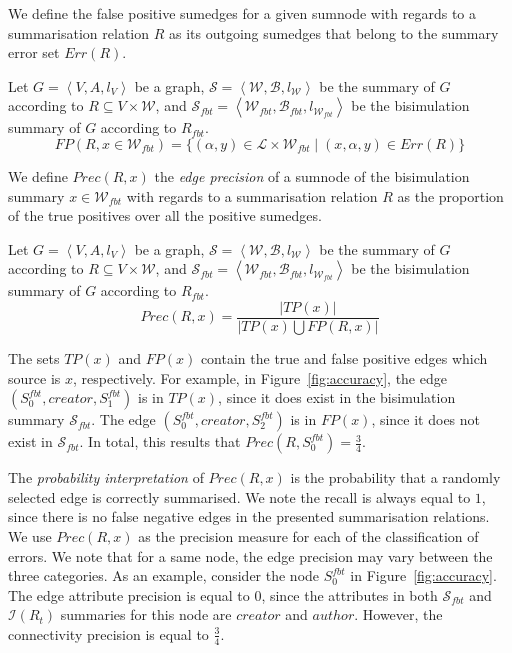 We define the false positive sumedges for a given sumnode with regards to a summarisation relation $R$ as its outgoing sumedges that belong to the summary error set $Err(R)$.

\begin{definition}
Let $G=\left\langle V, A, l_V \right\rangle$ be a graph, $\mathcal{S} = \left\langle \mathcal{W}, \mathcal{B}, l_{\mathcal{W}} \right\rangle$ be the summary of $G$ according to $R \subseteq V \times \mathcal{W}$, and $\mathcal{S}_{fbt} = \left\langle \mathcal{W}_{fbt}, \mathcal{B}_{fbt}, l_{\mathcal{W}_{fbt}} \right\rangle$ be the bisimulation summary of $G$ according to $R_{fbt}$.
$$
FP(R, x \in \mathcal{W}_{fbt}) = \{ (\alpha, y) \in \mathcal{L} \times \mathcal{W}_{fbt} \mid (x, \alpha, y) \in Err(R) \}
$$
\end{definition}

We define $Prec(R, x)$ the \emph{edge precision} of a sumnode of the bisimulation summary $x \in \mathcal{W}_{fbt}$ with regards to a summarisation relation $R$ as the proportion of the true positives over all the positive sumedges.

\begin{definition}
Let $G=\left\langle V, A, l_V \right\rangle$ be a graph, $\mathcal{S} = \left\langle \mathcal{W}, \mathcal{B}, l_{\mathcal{W}} \right\rangle$ be the summary of $G$ according to $R \subseteq V \times \mathcal{W}$, and $\mathcal{S}_{fbt} = \left\langle \mathcal{W}_{fbt}, \mathcal{B}_{fbt}, l_{\mathcal{W}_{fbt}} \right\rangle$ be the bisimulation summary of $G$ according to $R_{fbt}$.
$$
Prec(R, x) = \frac{\vert TP(x) \vert}{\vert TP(x) \bigcup FP(R, x) \vert}
$$
\end{definition}

The sets $TP(x)$ and $FP(x)$ contain the true and false positive edges which source is $x$, respectively. For example, in Figure~\ref{fig:accuracy}, the edge $(S^{fbt}_0, creator, S^{fbt}_1)$ is in $TP(x)$, since it does exist in the bisimulation summary $\mathcal{S}_{fbt}$. The edge $(S^{fbt}_0, creator, S^{fbt}_2)$ is in $FP(x)$, since it does not exist in $\mathcal{S}_{fbt}$. In total, this results that $Prec\left(R, S^{fbt}_0\right) = \frac{3}{4}$.

The \emph{probability interpretation} of $Prec(R, x)$ is the probability that a randomly selected edge is correctly summarised. We note the recall is always equal to $1$, since there is no false negative edges in the presented summarisation relations.\\

We use $Prec(R, x)$ as the precision measure for each of the classification of errors. We note that for a same node, the edge precision may vary between the three categories. As an example, consider the node $S^{fbt}_0$ in Figure~\ref{fig:accuracy}. The edge attribute precision is equal to $0$, since the attributes in both $\mathcal{S}_{fbt}$ and $\mathcal{I}(R_t)$ summaries for this node are $creator$ and $author$. However, the connectivity precision is equal to $\frac{3}{4}$.
